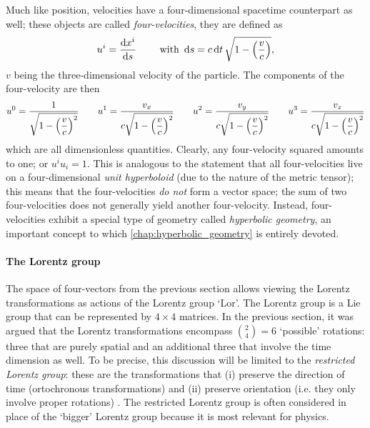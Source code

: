 Much like position, velocities have a four-dimensional spacetime counterpart as well; these objects are called \emph{four-velocities}, they are defined as \cite{Landau1971}
\[ u^i = \dv{x^i}{s} \qquad \text{ with } \dd{s} = c\dd{t} \sqrt{1 - \qty(\frac{v}{c})},\]
\(v\) being the three-dimensional velocity of the particle. The components of the four-velocity are then
\[ 
u^0 = \frac{\displaystyle 1}{\displaystyle \sqrt{1 - \qty(\frac{v}{c})^2}} 
\qquad  u^1 = \frac{\displaystyle v_x}{\displaystyle c\sqrt{1 - \qty(\frac{v}{c})^2}}
\qquad  u^2 = \frac{\displaystyle v_y}{\displaystyle c\sqrt{1 - \qty(\frac{v}{c})^2}}
\qquad  u^3 = \frac{\displaystyle v_z}{\displaystyle c\sqrt{1 - \qty(\frac{v}{c})^2}}
\]
which are all dimensionless quantities. Clearly, any four-velocity squared amounts to one; or \(u^i u_i = 1\). This is analogous to the statement that all four-velocities live on a four-dimensional \emph{unit hyperboloid} (due to the nature of the metric tensor); this means that the four-velocities \emph{do not} form a vector space; the sum of two four-velocities does not generally yield another four-velocity. Instead, four-velocities exhibit a special type of geometry called \emph{hyperbolic geometry}, an important concept to which \cref{chap:hyperbolic_geometry} is entirely devoted.

\paragraph{The Lorentz group} The space of four-vectors from the previous section allows viewing the Lorentz transformations as actions of the Lorentz group `$\text{Lor}$'. The Lorentz group is a Lie group that can be represented by $4\times4$ matrices. In the previous section, it was argued that the Lorentz transformations encompass $\binom{2}{4} = 6$ `possible' rotations: three that are purely spatial and an additional three that involve the time dimension as well. To be precise, this discussion will be limited to the \emph{restricted Lorentz group}: these are the transformations that (i) preserve the direction of time (ortochronous transformations) and (ii) preserve orientation (i.e. they only involve proper rotations) \cite{Tung1985}. The restricted Lorentz group is often considered in place of the `bigger' Lorentz group because it is most relevant for physics.

